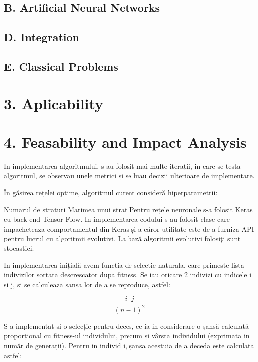 \documentclass[11pt]{article}
\begin{document}
    \hypertarget{b.-artificial-neural-networks}{%
\subsection{B. Artificial Neural
Networks}\label{b.-artificial-neural-networks}}

    \hypertarget{d.-integration}{%
\subsection{D. Integration}\label{d.-integration}}

    \hypertarget{e.-classical-problems}{%
\subsection{E. Classical Problems}\label{e.-classical-problems}}

    \hypertarget{aplicability}{%
\section{3. Aplicability}\label{aplicability}}

    \hypertarget{feasability-and-impact-analysis}{%
\section{4. Feasability and Impact
Analysis}\label{feasability-and-impact-analysis}}

In implementarea algoritmului, s-au folosit mai multe iterații, in care
se testa algoritmul, se observau unele metrici și se luau decizii
ulterioare de implementare.

În găsirea rețelei optime, algoritmul curent consideră hiperparametrii:

Numarul de straturi Marimea unui strat Pentru rețele neuronale s-a
folosit Keras cu back-end Tensor Flow. In implementarea codului s-au
folosit clase care impacheteaza comportamentul din Keras și a căror
utilitate este de a furniza API pentru lucrul cu algoritmii evolutivi.
La bază algoritmii evolutivi folosiți sunt stocastici.

In implementarea inițială avem functia de selectie naturala, care
primeste lista indivizilor sortata descrescator dupa fitness. Se iau
oricare 2 indivizi cu indicele i si j, si se calculeaza sansa lor de a
se reproduce, astfel:

    \[\frac{i \cdot j}{{(n - 1)}^{2}}\]

    S-a implementat si o selecție pentru deces, ce ia in considerare o șansă
calculată proporțional cu fitness-ul individului, precum și vârsta
individului (exprimata in număr de generații). Pentru in individ i,
șansa acestuia de a deceda este calculata astfel:
\end{document}
